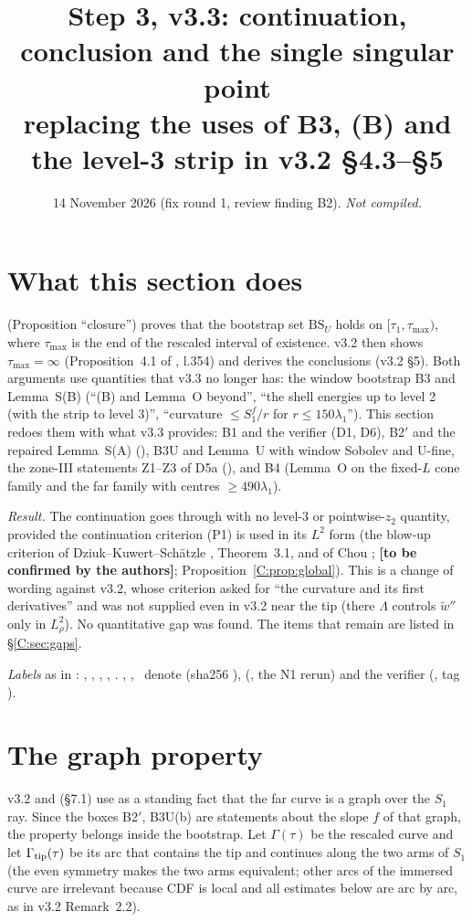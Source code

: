 \documentclass[11pt]{article}
\title{Step 3, v3.3: continuation, conclusion and the single singular point\\[2pt]\large replacing the uses of B3, (B) and the level-3 strip in v3.2 \S4.3--\S5}
\author{}\date{14 November 2026 (fix round 1, review finding B2). \emph{Not compiled.}}
\begin{document}
\maketitle
\fi

\section{What this section does}\label{C:sec:intro}
 (Proposition ``closure'') proves that the bootstrap set $\mathrm{BS}_U$ holds on $[\tau_1,\tau_{\max})$, where $\tau_{\max}$ is the end of the rescaled interval of existence. v3.2 then shows $\tau_{\max}=\infty$ (Proposition~4.1 of , l.354) and derives the conclusions (v3.2 \S5). Both arguments use quantities that v3.3 no longer has: the window bootstrap B3 and Lemma~S(B) (``(B) and Lemma~O beyond'', ``the shell energies up to level 2 (with the strip to level 3)'', ``curvature $\le S_1^f/r$ for $r\le150\lambda_1$''). This section redoes them with what v3.3 provides: B1 and the verifier (D1, D6), B2$'$ and the repaired Lemma~S(A) (), B3U and Lemma~U with window Sobolev and U-fine, the zone-III statements Z1--Z3 of D5a (), and B4 (Lemma~O on the fixed-$L$ cone family and the far family with centres $\ge490\lambda_1$).

\noindent\emph{Result.} The continuation goes through with no level-3 or pointwise-$z_2$ quantity, provided the continuation criterion (P1) is used in its $L^2$ form (the blow-up criterion of Dziuk--Kuwert--Sch\"atzle \cite{DKS2002}, Theorem~3.1, and of Chou \cite{Chou2003}; \textbf{[to be confirmed by the authors]}; Proposition~\ref{C:prop:global}). This is a change of wording against v3.2, whose criterion asked for ``the curvature and its first derivatives'' and was not supplied even in v3.2 near the tip (there $\Lambda$ controls $\tilde w''$ only in $L^2_\rho$). No quantitative gap was found. The items that remain are listed in \S\ref{C:sec:gaps}.

\noindent\emph{Labels} as in : \tC, \tP, \tH, \tE, \tB. \SU, \SZ, \SV\ denote  (sha256 ),  (, the N1 rerun) and the verifier  (, tag ).

\section{The graph property}\label{C:sec:graph}
v3.2 and  (\S7.1) use as a standing fact that the far curve is a graph over the $S_1$ ray. Since the boxes B2$'$, B3U(b) are statements about the slope $f$ of that graph, the property belongs inside the bootstrap. Let $\Gamma(\tau)$ be the rescaled curve and let $\Gamma_{\rm tip}(\tau)$ be its arc that contains the tip and continues along the two arms of $S_1$ (the even symmetry makes the two arms equivalent; other arcs of the immersed curve are irrelevant because CDF is local and all estimates below are arc by arc, as in v3.2 Remark~2.2).
\end{document}
